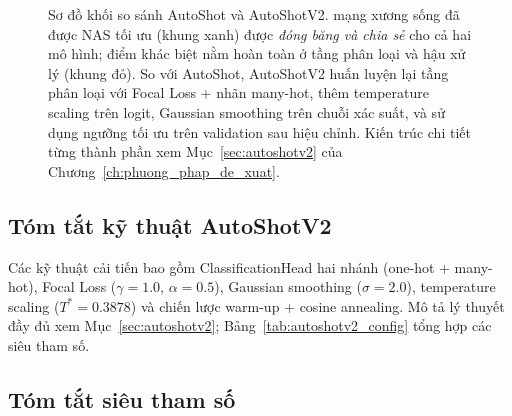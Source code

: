 \begin{figure}[H]
{
}

\caption[Sơ đồ so sánh quy trình AutoShot và AutoShotV2]{Sơ đồ khối so sánh AutoShot và AutoShotV2. mạng xương sống đã được NAS tối ưu (khung xanh) được \textit{đóng băng và chia sẻ} cho cả hai mô hình; điểm khác biệt nằm hoàn toàn ở tầng phân loại và hậu xử lý (khung đỏ). So với AutoShot, AutoShotV2 huấn luyện lại tầng phân loại với Focal Loss + nhãn many-hot, thêm temperature scaling trên logit, Gaussian smoothing trên chuỗi xác suất, và sử dụng ngưỡng tối ưu trên validation sau hiệu chỉnh. Kiến trúc chi tiết từng thành phần xem Mục~\ref{sec:autoshotv2} của Chương~\ref{ch:phuong_phap_de_xuat}.}
\label{fig:pipeline_compare}
\end{figure}
\FloatBarrier

\subsection{Tóm tắt kỹ thuật AutoShotV2}

Các kỹ thuật cải tiến bao gồm ClassificationHead hai nhánh (one-hot + many-hot), Focal Loss ($\gamma=1.0$, $\alpha=0.5$), Gaussian smoothing ($\sigma=2.0$), temperature scaling ($T^*=0.3878$) và chiến lược warm-up + cosine annealing. Mô tả lý thuyết đầy đủ xem Mục~\ref{sec:autoshotv2}; Bảng~\ref{tab:autoshotv2_config} tổng hợp các siêu tham số.

\subsection{Tóm tắt siêu tham số}


